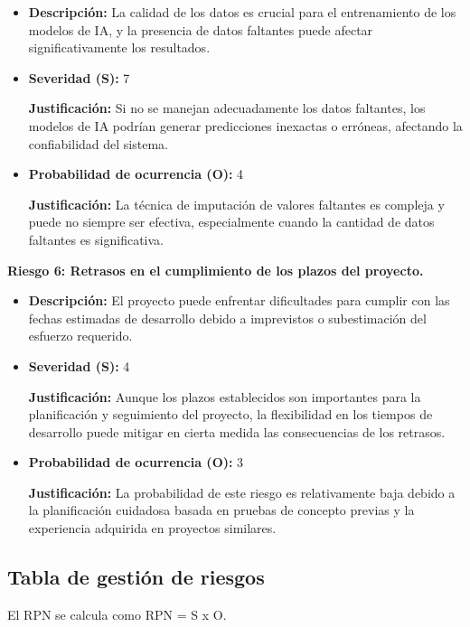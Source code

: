 \documentclass[
11pt, %
codirector, %
]{charter}
\begin{document}
\begin{itemize}
  \item \textbf{Descripción:} La calidad de los datos es crucial para el entrenamiento de los modelos de IA, y la presencia de datos faltantes puede afectar significativamente los resultados.
  \item \textbf{Severidad (S):} 7
  
  \textbf{Justificación:} Si no se manejan adecuadamente los datos faltantes, los modelos de IA podrían generar predicciones inexactas o erróneas, afectando la confiabilidad del sistema.
  \item \textbf{Probabilidad de ocurrencia (O):} 4
  
  \textbf{Justificación:} La técnica de imputación de valores faltantes es compleja y puede no siempre ser efectiva, especialmente cuando la cantidad de datos faltantes es significativa.
\end{itemize}

\textbf{Riesgo 6: Retrasos en el cumplimiento de los plazos del proyecto.}

\begin{itemize}
  \item \textbf{Descripción:} El proyecto puede enfrentar dificultades para cumplir con las fechas estimadas de desarrollo debido a imprevistos o subestimación del esfuerzo requerido.
  \item \textbf{Severidad (S):} 4
  
  \textbf{Justificación:} Aunque los plazos establecidos son importantes para la planificación y seguimiento del proyecto, la flexibilidad en los tiempos de desarrollo puede mitigar en cierta medida las consecuencias de los retrasos.
  \item \textbf{Probabilidad de ocurrencia (O):} 3
  
  \textbf{Justificación:} La probabilidad de este riesgo es relativamente baja debido a la planificación cuidadosa basada en pruebas de concepto previas y la experiencia adquirida en proyectos similares.
\end{itemize}

\subsection{Tabla de gestión de riesgos}

El RPN se calcula como RPN = S x O.
\end{document}
